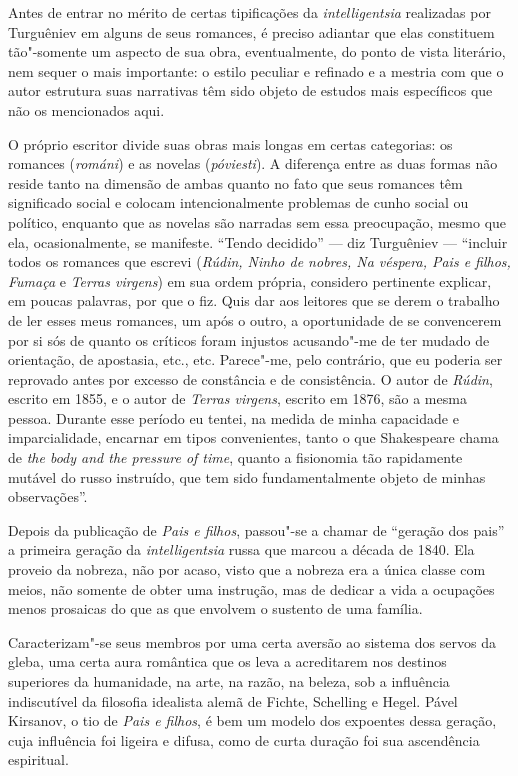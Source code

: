 Antes de entrar no mérito de certas tipificações da \emph{intelligentsia}
realizadas por Turguêniev em alguns de seus romances, é preciso adiantar
que elas constituem tão"-somente um aspecto de sua obra, eventualmente,
do ponto de vista literário, nem sequer o mais importante: o estilo
peculiar e refinado e a mestria com que o autor estrutura suas
narrativas têm sido objeto de estudos mais específicos que não os
mencionados aqui.

O próprio escritor divide suas obras mais longas em certas categorias:
os romances (\emph{románi}) e as novelas (\emph{póviesti}). A diferença entre
as duas formas não reside tanto na dimensão de ambas quanto no fato que
seus romances têm significado social e colocam intencionalmente
problemas de cunho social ou político, enquanto que as novelas são
narradas sem essa preocupação, mesmo que ela, ocasionalmente, se
manifeste. ``Tendo decidido'' --- diz Turguêniev --- ``incluir todos os
romances que escrevi (\emph{Rúdin, Ninho de nobres, Na véspera, Pais e
filhos, Fumaça} e \emph{Terras virgens}) em sua ordem própria, considero
pertinente explicar, em poucas palavras, por que o fiz. Quis dar aos
leitores que se derem o trabalho de ler esses meus romances, um após o
outro, a oportunidade de se convencerem por si sós de quanto os críticos
foram injustos acusando"-me de ter mudado de orientação, de apostasia,
etc., etc. Parece"-me, pelo contrário, que eu poderia ser reprovado antes
por excesso de constância e de consistência. O autor de \emph{Rúdin},
escrito em 1855, e o autor de \emph{Terras virgens}, escrito em 1876,
são a mesma pessoa. Durante esse período eu tentei, na medida de minha
capacidade e imparcialidade, encarnar em tipos convenientes, tanto
o que Shakespeare chama de \emph{the body and the pressure of time},
quanto a fisionomia tão rapidamente mutável do russo instruído, que tem
sido fundamentalmente objeto de minhas observações''.

Depois da publicação de \emph{Pais e filhos}, passou"-se a chamar de
``geração dos pais'' a primeira geração da \emph{intelligentsia} russa
que marcou a década de 1840. Ela proveio da nobreza, não por acaso,
visto que a nobreza era a única classe com meios, não somente de obter
uma instrução, mas de dedicar a vida a ocupações menos prosaicas do que
as que envolvem o sustento de uma família.

Caracterizam"-se seus membros por uma certa aversão ao sistema dos servos
da gleba, uma certa aura romântica que os leva a acreditarem nos
destinos superiores da humanidade, na arte, na razão, na beleza, sob a
influência indiscutível da filosofia idealista alemã de Fichte,
Schelling e Hegel. Pável Kirsanov, o tio de \emph{Pais e filhos}, é bem
um modelo dos expoentes dessa geração, cuja influência foi ligeira e
difusa, como de curta duração foi sua ascendência espiritual.

